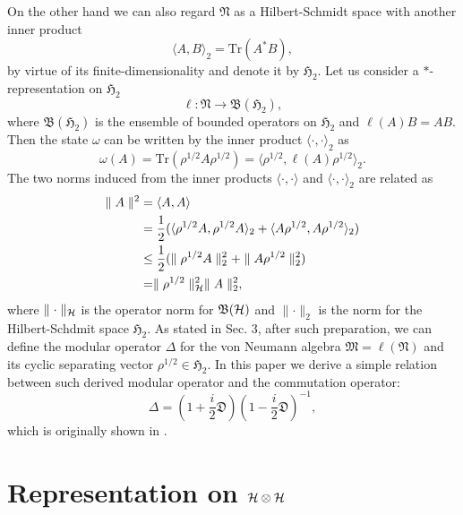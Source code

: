 \documentclass{article}
\begin{document}
On the other hand we can also regard $\mathfrak{N}$ as a Hilbert-Schmidt space with another inner product
$$
\langle A, B \rangle_2 =\mbox{Tr}(A^{\ast}B),
$$
by virtue of its finite-dimensionality and denote it by $\mathfrak{H}_2$.
Let us consider a $\ast$-representation on $\mathfrak{H}_2$
\begin{equation}\label{star-rep}
\ell :\mathfrak{N}\to \mathfrak{B}(\mathfrak{H}_2),
\end{equation}
where $\mathfrak{B}(\mathfrak{H}_2)$ is the ensemble of bounded operators on $\mathfrak{H}_2$
and $\ell(A)B=AB$.
Then the state $\omega$ can be written by the inner product $\langle \cdot, \cdot\rangle_2$ as 
$$
\omega(A)=\mbox{Tr}(\rho^{1/2}A\rho^{1/2})=\langle \rho^{1/2},\ell(A)\rho^{1/2}\rangle_2 .
$$
The two norms induced from the inner products $\langle \cdot,\cdot \rangle$ and 
$\langle \cdot,\cdot \rangle_2$ are related as
\begin{equation}
\begin{split}
\parallel A\parallel^2 &= \langle A,A\rangle \\
&=\frac{1}{2}(\langle \rho^{1/2}A,\rho^{1/2}A\rangle_2+\langle A\rho^{1/2},A\rho^{1/2}\rangle_2  )\\
&\leq \frac{1}{2}(\parallel \rho^{1/2}A\parallel_2^2+\parallel A\rho^{1/2}\parallel_2^2)\\
&=\parallel \rho^{1/2}\parallel_{\cal H} ^2 \parallel A\parallel_2^2,
\end{split}
\end{equation}
where $\parallel \cdot \parallel_{\cal H}$ is the operator norm for $\mathfrak{B}({\cal H})$
and $\parallel \cdot \parallel_2$ is the norm for the Hilbert-Schdmit space $\mathfrak{H}_2$. 
As stated in Sec. 3, after such preparation, we can define the
modular operator $\Delta$ for the von Neumann algebra $\mathfrak{M}=\ell(\mathfrak{N})$ and its cyclic separating vector $\rho^{1/2} \in \mathfrak{H}_2$. 
In this paper we derive a simple relation between such derived modular operator and the commutation operator:
$$
    \Delta=\left(1+\frac{i}{2}\mathfrak{D}\right)\left(1-\frac{i}{2}\mathfrak{D}\right)^{-1},
$$
which is originally shown in \cite{Holevo_1977}.


\section{Representation on $\cal{H}\otimes\cal{H}$}
\end{document}
